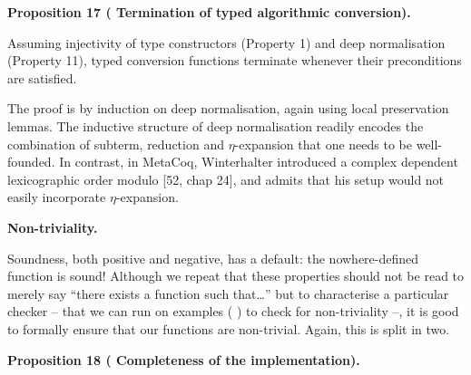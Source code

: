 \documentclass[10pt,a4paper]{amsart}
\begin{document}
 
 
\par\medskip\noindent\textbf{Proposition 17 (  Termination of typed algorithmic conversion).}\par
 
 
Assuming injectivity of type constructors (Property 1) and deep normalisation (Property 11), typed conversion functions terminate whenever their preconditions are satisfied.\par
 
 
 
 
The proof is by induction on deep normalisation, again using local preservation lemmas. The inductive structure of deep normalisation readily encodes the combination of subterm, reduction and $\eta$-expansion that one needs to be well-founded. In contrast, in MetaCoq, Winterhalter introduced a complex dependent lexicographic order modulo [52, chap 24], and admits that his setup would not easily incorporate $\eta$-expansion.\par
 
 
 
 
\par\medskip\noindent\textbf{Non-triviality.}\par
 
 
Soundness, both positive and negative, has a default: the nowhere-defined function is sound! Although we repeat that these properties should not be read to merely say “there exists a function such that…” but to characterise a particular checker – that we can run on examples ( ) to check for non-triviality –, it is good to formally ensure that our functions are non-trivial. Again, this is split in two.\par
 
 
 
\par\medskip\noindent\textbf{Proposition 18 (  Completeness of the implementation).}\par
 
\end{document}
